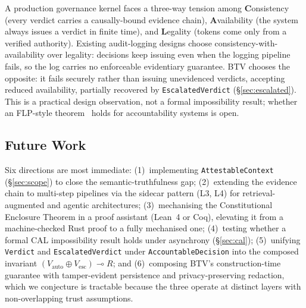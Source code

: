 A production governance kernel faces a three-way tension among
\textbf{C}onsistency (every verdict carries a causally-bound evidence
chain), \textbf{A}vailability (the system always issues a verdict in
finite time), and \textbf{L}egality (tokens come only from a verified
authority). Existing audit-logging designs choose
consistency-with-availability over legality: decisions keep issuing
even when the logging pipeline fails, so the log carries no
enforceable evidentiary guarantee. BTV chooses the opposite: it fails
securely rather than issuing unevidenced verdicts, accepting reduced
availability, partially recovered by \texttt{EscalatedVerdict}
(\S\ref{sec:escalated}). This is a practical design observation, not a
formal impossibility result; whether an FLP-style
theorem~\cite{flp1985} holds for accountability systems is open.

\subsection{Future Work}
\label{sec:future}

Six directions are most immediate: (1)~implementing
\texttt{AttestableContext} (\S\ref{sec:scope}) to close the
semantic-truthfulness gap; (2)~extending the evidence chain to
multi-step pipelines via the sidecar pattern (L3, L4) for
retrieval-augmented and agentic architectures; (3)~mechanising the
Constitutional Enclosure Theorem in a proof assistant (Lean~4 or Coq),
elevating it from a machine-checked Rust proof to a fully mechanised
one; (4)~testing whether a formal CAL impossibility result holds under
asynchrony (\S\ref{sec:cal}); (5)~unifying \texttt{Verdict} and
\texttt{EscalatedVerdict} under \texttt{AccountableDecision} into the
composed invariant $(V_{\mathrm{auto}} \oplus V_{\mathrm{esc}})
\multimap R$; and (6)~composing BTV's construction-time guarantee with
tamper-evident persistence and privacy-preserving redaction, which we
conjecture is tractable because the three operate at distinct layers
with non-overlapping trust assumptions.
